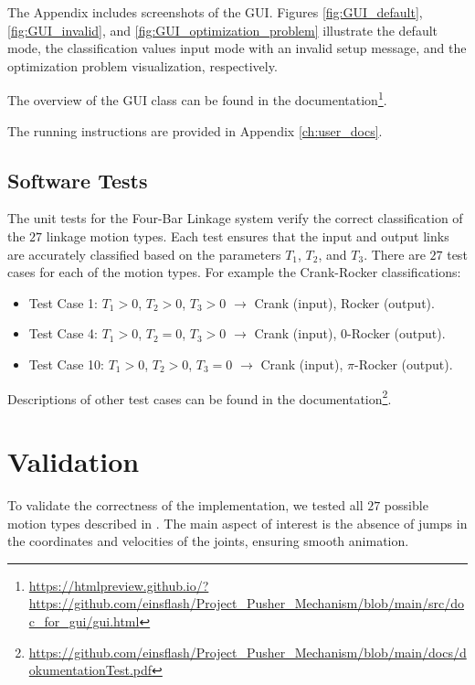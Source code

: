 \documentclass{article}
\begin{document}
The Appendix includes screenshots of the GUI. Figures \ref{fig:GUI_default}, \ref{fig:GUI_invalid}, and \ref{fig:GUI_optimization_problem} illustrate the default mode, the classification values input mode with an invalid setup message, and the optimization problem visualization, respectively.

The overview of the GUI class can be found in the documentation\footnote{\url{https://htmlpreview.github.io/?https://github.com/einsflash/Project_Pusher_Mechanism/blob/main/src/doc_for_gui/gui.html}}.

The running instructions are provided in Appendix \ref{ch:user_docs}.

\subsection{Software Tests}

The unit tests for the Four-Bar Linkage system verify the correct classification of the $27$ linkage motion types. Each test ensures that the input and output links are accurately classified based on the parameters $T_1$, $T_2$, and $T_3$. There are $27$ test cases for each of the motion types. For example the Crank-Rocker classifications:

\begin{itemize}
	\item Test Case 1: $T_1 > 0$, $T_2 > 0$, $T_3 > 0$ $\rightarrow$ Crank (input), Rocker (output).
	\item Test Case 4: $T_1 > 0$, $T_2 = 0$, $T_3 > 0$ $\rightarrow$ Crank (input), 0-Rocker (output).
	\item Test Case 10: $T_1 > 0$, $T_2 > 0$, $T_3 = 0$ $\rightarrow$ Crank (input), \(\pi\)-Rocker (output).
\end{itemize}

Descriptions of other test cases can be found in the documentation\footnote{\url{https://github.com/einsflash/Project_Pusher_Mechanism/blob/main/docs/dokumentationTest.pdf}}.

\section{Validation}\label{ch:validation}

To validate the correctness of the implementation, we tested all $27$ possible motion types described in \cite{inproceedings}. The main aspect of interest is the absence of jumps in the coordinates and velocities of the joints, ensuring smooth animation. 
\end{document}
